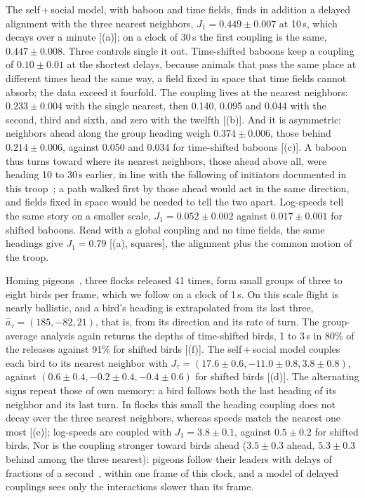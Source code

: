 The self\,+\,social model, with baboon and time fields, finds in addition a delayed alignment with the three nearest neighbors, $J_1=0.449\pm0.007$ at 10\,s, which decays over a minute [(a)]; on a clock of 30\,s the first coupling is the same, $0.447\pm0.008$. Three controls single it out. Time-shifted baboons keep a coupling of $0.10\pm0.01$ at the shortest delays, because animals that pass the same place at different times head the same way, a field fixed in space that time fields cannot absorb; the data exceed it fourfold. The coupling lives at the nearest neighbors: $0.233\pm0.004$ with the single nearest, then 0.140, 0.095 and 0.044 with the second, third and sixth, and zero with the twelfth [(b)]. And it is asymmetric: neighbors ahead along the group heading weigh $0.374\pm0.006$, those behind $0.214\pm0.006$, against 0.050 and 0.034 for time-shifted baboons [(c)]. A baboon thus turns toward where its nearest neighbors, those ahead above all, were heading 10 to 30\,s earlier, in line with the following of initiators documented in this troop~\cite{StrandburgPeshkin2015}; a path walked first by those ahead would act in the same direction, and fields fixed in space would be needed to tell the two apart. Log-speeds tell the same story on a smaller scale, $J_1=0.052\pm0.002$ against $0.017\pm0.001$ for shifted baboons. Read with a global coupling and no time fields, the same headings give $J_1=0.79$ [(a), squares], the alignment plus the common motion of the troop.

Homing pigeons~\cite{MehlhausenFranks2025,MehlhausenFranks2025data}, three flocks released 41 times, form small groups of three to eight birds per frame, which we follow on a clock of 1\,s. On this scale flight is nearly ballistic, and a bird's heading is extrapolated from its last three, $\hat a_\tau=(185,-82,21)$, that is, from its direction and its rate of turn. The group-average analysis again returns the depths of time-shifted birds, 1 to 3\,s in 80\% of the releases against 91\% for shifted birds [(f)]. The self\,+\,social model couples each bird to its nearest neighbor with $J_\tau=(17.6\pm0.6,-11.0\pm0.8,3.8\pm0.8)$, against $(0.6\pm0.4,-0.2\pm0.4,-0.4\pm0.6)$ for shifted birds [(d)]. The alternating signs repeat those of own memory: a bird follows both the last heading of its neighbor and its last turn. In flocks this small the heading coupling does not decay over the three nearest neighbors, whereas speeds match the nearest one most [(e)]; log-speeds are coupled with $J_1=3.8\pm0.1$, against $0.5\pm0.2$ for shifted birds. Nor is the coupling stronger toward birds ahead ($3.5\pm0.3$ ahead, $5.3\pm0.3$ behind among the three nearest): pigeons follow their leaders with delays of fractions of a second~\cite{Nagy2010}, within one frame of this clock, and a model of delayed couplings sees only the interactions slower than its frame.

